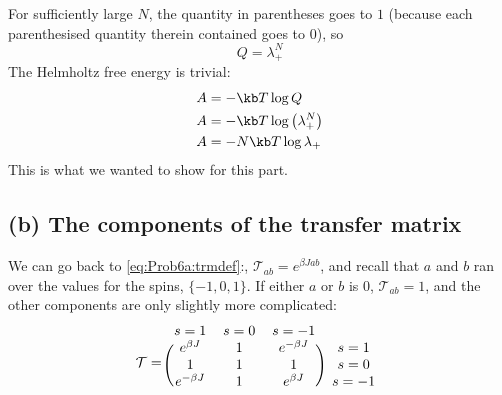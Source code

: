 \documentclass[../../PS3.tex]{subfiles}
\newcommand{\trm}{\mathcal{T}}
\begin{document}
For sufficiently large $N$, the quantity in parentheses goes to $1$ (because each parenthesised quantity therein contained goes to 0), so 
\begin{equation}
	Q = \lambda_+^N
\end{equation}
The Helmholtz free energy is trivial:
\begin{align}
	A &= - \kb T \log{Q} \\
	A &= -\kb T \log\left(\lambda_+^N\right) \\
	A &= - N \kb T \log \lambda_+
\end{align}
This is what we wanted to show for this part.

\subsection*{(b) The components of the transfer matrix}

We can go back to \eqref{eq:Prob6a:trmdef}:, $\trm_{ab} = e^{\beta J a b}$, and recall that $a$ and $b$ ran over the values for the spins, $\{-1 ,0, 1\}$. If either $a$ or $b$ is 0, $\trm_{ab} = 1$, and the other components are only slightly more complicated:
\begin{align}
	\trm =
	\begin{blockarray}{cccc}
		s=1 & s=0 & s=-1 &  \\
		\begin{block}{(ccc)c}
		  e^{\beta  J } & 1 & e^{-\beta  J } & s=1 \\
		  1 & 1 & 1 & s=0 \\
		  e^{-\beta  J } & 1 & e^{\beta  J } & s=-1 \\
		\end{block}
	\end{blockarray}
\end{align}
\end{document}
